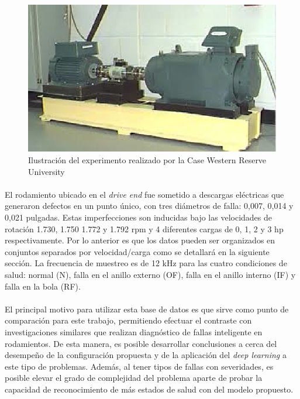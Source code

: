 \documentclass[a4paper,12pt]{article}
\begin{document}
\begin{figure}[ht]
  \centering
    \includegraphics[scale=0.8]{./bearing.eps}
  \caption{Ilustración del experimento realizado por la Case Western Reserve University \cite{case}}
  \label{fig:bearing}
\end{figure}

\paragraph{}
El rodamiento ubicado en el \textit{drive end} fue sometido a descargas eléctricas que generaron defectos en un  punto único, con tres diámetros de falla: 0,007, 0,014 y 0,021 pulgadas. Estas imperfecciones son inducidas bajo las velocidades de rotación 1.730, 1.750 1.772 y 1.792 rpm y 4 diferentes cargas de 0, 1, 2 y 3 hp respectivamente. Por lo anterior es que los datos pueden ser organizados en conjuntos separados por velocidad/carga como se detallará en la siguiente sección. La frecuencia de muestreo es de 12 kHz para las cuatro condiciones de salud: normal (N), falla en el anillo externo (OF), falla en el anillo interno (IF) y falla en la bola (RF). 

\paragraph{}
El principal motivo para utilizar esta base de datos es que sirve como punto de comparación para este trabajo, permitiendo efectuar el contraste con investigaciones similares que realizan diagnóstico de fallas inteligente en rodamientos. De esta manera, es posible desarrollar conclusiones a cerca del desempeño de la configuración propuesta y de la aplicación del \textit{deep learning} a este tipo de problemas. Además, al tener tipos de fallas con severidades, es posible elevar el grado de complejidad del problema aparte de probar la capacidad de reconocimiento de más estados de salud con del modelo propuesto.
\end{document}
